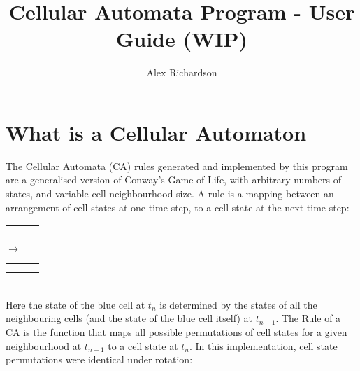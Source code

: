 \documentclass{article}
\title{Cellular Automata Program - User Guide (WIP)}
\author{Alex Richardson}
\begin{document}
	\maketitle
	\section{What is a Cellular Automaton}
	
	The Cellular Automata (CA) rules generated and implemented by this program are a generalised version of Conway's Game of Life, with arbitrary numbers of states, and variable cell neighbourhood size. A rule is a mapping between an arrangement of cell states at one time step, to a cell state at the next time step:\\
	
	\begin{tabular}{ | l | c | r |}
		\hline
		 \cellcolor{pink}& \cellcolor{red} &\cellcolor{pink}  \\ \hline
		 \cellcolor{red}& \cellcolor{black} &\cellcolor{red}  \\ \hline
		 \cellcolor{pink}& \cellcolor{red} &\cellcolor{pink}  \\
		\hline
	\end{tabular}
	$\rightarrow$
	\begin{tabular}{ | l | c | r |}
		\hline
		&  &  \\ \hline
	 	& \cellcolor{blue} &  \\ \hline
	 	&  &  \\
	 	\hline
	\end{tabular}\\
	
	Here the state of the blue cell at $t_n$ is determined by the states of all the neighbouring cells (and the state of the blue cell itself) at $t_{n-1}$. The Rule of a CA is the function that maps all possible permutations of cell states for a given neighbourhood at $t_{n-1}$ to a cell state at $t_n$. In this implementation, cell state permutations were identical under rotation:\\
	
\end{document}

